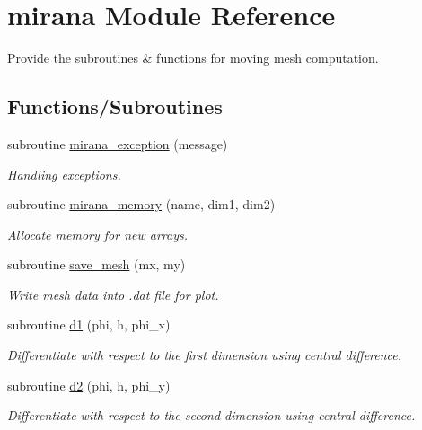\hypertarget{namespacemirana}{}\section{mirana Module Reference}
\label{namespacemirana}


Provide the subroutines \& functions for moving mesh computation.  


\subsection*{Functions/\+Subroutines}
\begin{DoxyCompactItemize}
\item 
subroutine \hyperlink{namespacemirana_ab002a22665f70b4c65bdcf70ac96d768}{mirana\+\_\+exception} (message)
\begin{DoxyCompactList}\small\item\em Handling exceptions. \end{DoxyCompactList}\item 
subroutine \hyperlink{namespacemirana_acccf612b21e3e65bd3a78131c48afe2b}{mirana\+\_\+memory} (name, dim1, dim2)
\begin{DoxyCompactList}\small\item\em Allocate memory for new arrays. \end{DoxyCompactList}\item 
subroutine \hyperlink{namespacemirana_a9cbee1a318e5e828590c9ccaa51c8472}{save\+\_\+mesh} (mx, my)
\begin{DoxyCompactList}\small\item\em Write mesh data into .dat file for plot. \end{DoxyCompactList}\item 
subroutine \hyperlink{namespacemirana_a4009036e8b04ac992641e36d34ab0ed4}{d1} (phi, h, phi\+\_\+x)
\begin{DoxyCompactList}\small\item\em Differentiate with respect to the first dimension using central difference. \end{DoxyCompactList}\item 
subroutine \hyperlink{namespacemirana_a21348ffe170eafc6fc2a009256b1b6e3}{d2} (phi, h, phi\+\_\+y)
\begin{DoxyCompactList}\small\item\em Differentiate with respect to the second dimension using central difference. \end{DoxyCompactList}\item 

\end{DoxyCompactItemize}
